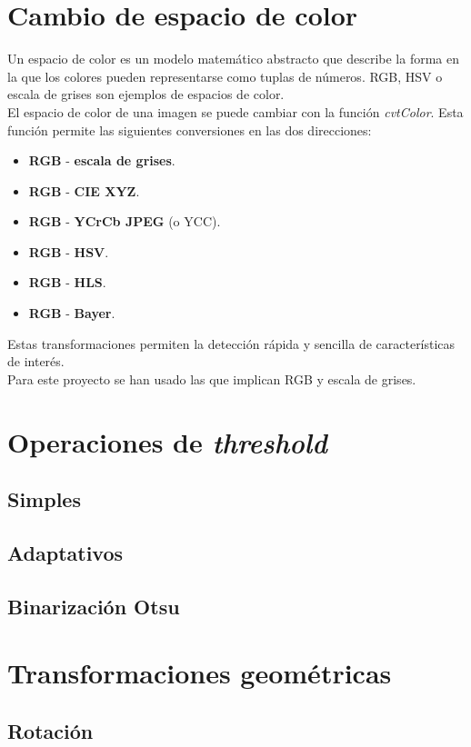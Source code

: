 \section{Cambio de espacio de color}
Un espacio de color es un modelo matemático abstracto que describe 
la forma en la que los colores pueden representarse como tuplas de 
números. RGB, HSV o escala de grises son ejemplos de espacios de color. \\
El espacio de color de una imagen se puede cambiar con la función \emph{cvtColor}.
Esta función permite las siguientes conversiones en las dos direcciones:
\begin{itemize}
\item  \textbf{RGB} - \textbf{escala de grises}.
\item  \textbf{RGB} - \textbf{CIE XYZ}.
\item  \textbf{RGB} - \textbf{YCrCb JPEG} (o YCC).
\item  \textbf{RGB} - \textbf{HSV}.
\item  \textbf{RGB} - \textbf{HLS}.
\item  \textbf{RGB} - \textbf{Bayer}.
\end{itemize}
Estas transformaciones permiten la detección rápida y sencilla de características
de interés. \\
Para este proyecto se han usado las que implican RGB y escala de grises.


\section{Operaciones de \emph{threshold}}
\subsection{Simples}
\subsection{Adaptativos}
\subsection{Binarización Otsu}

\section{Transformaciones geométricas}
\subsection{Rotación}

